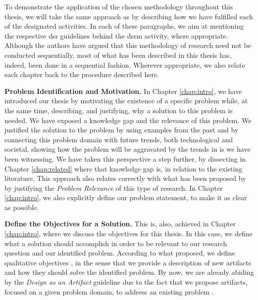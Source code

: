 To demonstrate the application of the chosen methodology throughout this thesis, we will take the same approach as \citeauthor{peffers_design_2007} \cite{peffers_design_2007} by describing how we have fulfilled each of the designated activities. In each of these paragraphs, we aim at mentioning the respective \gls{dsr} guidelines behind the \gls{dsrm} activity, where appropriate. Although the authors have argued that this methodology of research need not be conducted sequentially, most of what has been described in this thesis has, indeed, been done in a sequential fashion. Wherever appropriate, we also relate each chapter back to the procedure described here.

\textbf{Problem Identification and Motivation.} In Chapter \ref{chap:intro}, we have introduced our thesis by motivating the existence of a specific problem while, at the same time, describing, and justifying, why a solution to this problem is needed. We have exposed a knowledge gap and the relevance of this problem. We justified the solution to the problem by using examples from the past and by connecting this problem domain with future trends, both technological and societal, showing how the problem will be aggravated by the trends in \gls{is} we have been witnessing. We have taken this perspective a step further, by dissecting in Chapter \ref{chap:related} where that knowledge gap is, in relation to the existing literature. This approach also relates correctly with what has been proposed by \citeauthor{hevner_design_2004} \cite{hevner_design_2004} by justifying the \textit{Problem Relevance} of this type of research. In Chapter \ref{chap:intro}, we also explicitly define our problem statement, to make it as clear as possible.

\textbf{Define the Objectives for a Solution.} This is, also, achieved in Chapter \ref{chap:intro}, where we discuss the objectives for this thesis. In this case, we define what a solution should accomplish in order to be relevant to our research question and our identified problem. According to what \citeauthor{peffers_design_2007} \cite{peffers_design_2007} proposed, we define qualitative objectives \cite[13]{peffers_design_2007}, in the sense that we provide a description of new artifacts and how they should solve the identified problem. By now, we are already abiding by the \textit{Design as an Artifact} guideline \cite{hevner_design_2004} due to the fact that we propose artifacts, focused on a given problem domain, to address an existing problem \cite[82]{hevner_design_2004}.

